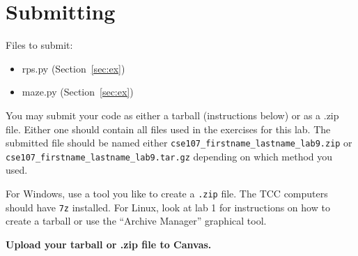 \documentclass[11pt]{cselabheader}
\begin{document}
\pagebreak
\section{Submitting}

Files to submit:
\begin{itemize}
\item rps.py (Section~\ref{sec:ex})
\item maze.py (Section~\ref{sec:ex})
\end{itemize}

You may submit your code as either a tarball (instructions below) or as a .zip
file. Either one should contain all files used in the exercises for this lab.
The submitted file should be named either
\texttt{cse107\_firstname\_lastname\_lab9.zip} or
\texttt{cse107\_firstname\_lastname\_lab9.tar.gz} depending on which method you
used.

For Windows, use a tool you like to create a \texttt{.zip} file. The TCC
computers should have \texttt{7z} installed. For Linux, look at lab 1 for
instructions on how to create a tarball or use the ``Archive Manager'' graphical
tool.

\begin{center}
  \textbf{Upload your tarball or .zip file to Canvas.}
\end{center}
\end{document}
